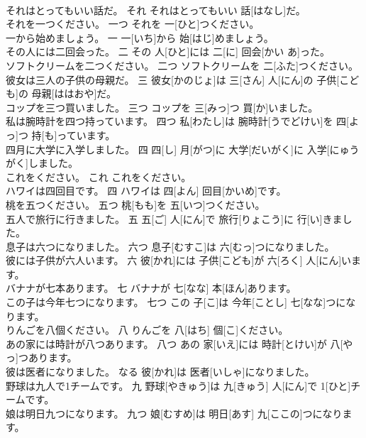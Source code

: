 \documentclass[8pt]{extreport}
\begin{document}
\begin{CJK}{UTF8}{min}
\\	それはとってもいい話だ。	それ	それはとってもいい 話[はなし]だ。	
\\	それを一つください。	一つ	それを 一[ひと]つください。	
\\	一から始めましょう。	一	一[いち]から 始[はじ]めましょう。	
\\	その人には二回会った。	二	その 人[ひと]には 二[に] 回会[かい あ]った。	
\\	ソフトクリームを二つください。	二つ	ソフトクリームを 二[ふた]つください。	
\\	彼女は三人の子供の母親だ。	三	彼女[かのじょ]は 三[さん] 人[にん]の 子供[こども]の 母親[ははおや]だ。	
\\	コップを三つ買いました。	三つ	コップを 三[みっ]つ 買[か]いました。	
\\	私は腕時計を四つ持っています。	四つ	私[わたし]は 腕時計[うでどけい]を 四[よっ]つ 持[も]っています。	
\\	四月に大学に入学しました。	四	四[し] 月[がつ]に 大学[だいがく]に 入学[にゅうがく]しました。	
\\	これをください。	これ	これをください。	
\\	ハワイは四回目です。	四	ハワイは 四[よん] 回目[かいめ]です。	
\\	桃を五つください。	五つ	桃[もも]を 五[いつ]つください。	
\\	五人で旅行に行きました。	五	五[ご] 人[にん]で 旅行[りょこう]に 行[い]きました。	
\\	息子は六つになりました。	六つ	息子[むすこ]は 六[むっ]つになりました。	
\\	彼には子供が六人います。	六	彼[かれ]には 子供[こども]が 六[ろく] 人[にん]います。	
\\	バナナが七本あります。	七	バナナが 七[なな] 本[ほん]あります。	
\\	この子は今年七つになります。	七つ	この 子[こ]は 今年[ことし] 七[なな]つになります。	
\\	りんごを八個ください。	八	りんごを 八[はち] 個[こ]ください。	
\\	あの家には時計が八つあります。	八つ	あの 家[いえ]には 時計[とけい]が 八[やっ]つあります。	
\\	彼は医者になりました。	なる	彼[かれ]は 医者[いしゃ]になりました。	
\\	野球は九人で1チームです。	九	野球[やきゅう]は 九[きゅう] 人[にん]で 1[ひと]チームです。	
\\	娘は明日九つになります。	九つ	娘[むすめ]は 明日[あす] 九[ここの]つになります。	

\end{CJK}
\end{document}
